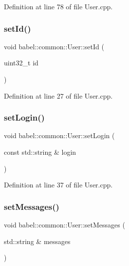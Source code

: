 Definition at line 78 of file User.\+cpp.

\mbox{\label{classbabel_1_1common_1_1_user_af41e9f23dc42c669de4127cfb14da579}} 
\subsubsection{\texorpdfstring{set\+Id()}{setId()}}
{\footnotesize\ttfamily void babel\+::common\+::\+User\+::set\+Id (\begin{DoxyParamCaption}\item[{uint32\+\_\+t}]{id }\end{DoxyParamCaption})}



Definition at line 27 of file User.\+cpp.

\mbox{\label{classbabel_1_1common_1_1_user_ac5cd71368a7f95d120c58edab902ca24}} 
\subsubsection{\texorpdfstring{set\+Login()}{setLogin()}}
{\footnotesize\ttfamily void babel\+::common\+::\+User\+::set\+Login (\begin{DoxyParamCaption}\item[{const std\+::string \&}]{login }\end{DoxyParamCaption})}



Definition at line 37 of file User.\+cpp.

\mbox{\label{classbabel_1_1common_1_1_user_a0c4a3f92d80b9eaedb4ce0ca42771847}} 
\subsubsection{\texorpdfstring{set\+Messages()}{setMessages()}}
{\footnotesize\ttfamily void babel\+::common\+::\+User\+::set\+Messages (\begin{DoxyParamCaption}\item[{std\+::string \&}]{messages }\end{DoxyParamCaption})}



